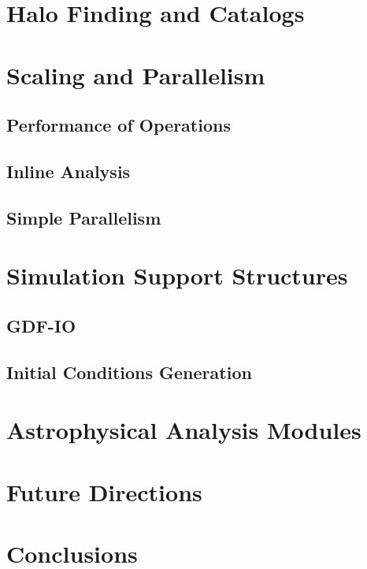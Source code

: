 \documentclass{emulateapj}
\begin{document}
\section{Halo Finding and Catalogs}

\section{Scaling and Parallelism}

\subsection{Performance of Operations}

\subsection{Inline Analysis}

\subsection{Simple Parallelism}

\section{Simulation Support Structures}

\subsection{GDF-IO}

\subsection{Initial Conditions Generation}

\section{Astrophysical Analysis Modules}

\section{Future Directions}

\section{Conclusions}\label{sec:conclusions}

\acknowledgments 


\end{document}
